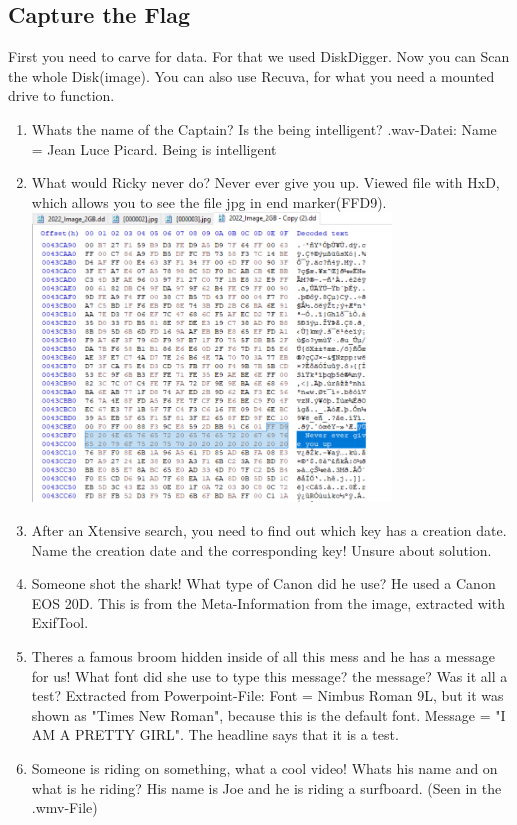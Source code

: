 \documentclass{scrreprt}
\begin{document}
\subsection{Capture the Flag}
First you need to carve for data. For that we used DiskDigger. Now you can Scan the whole Disk(image).
You can also use Recuva, for what you need a mounted drive to function.
\begin{enumerate}
\item Whats the name of the Captain? Is the being intelligent?
.wav-Datei: Name = Jean Luce Picard. Being is intelligent
\item What would Ricky never do?
Never ever give you up. Viewed file with HxD, which allows you to see the file jpg in end marker(FFD9).
\\\includegraphics[width=0.75\textwidth]{"graphics/hdx"}
\item After an Xtensive search, you need to find out which key has a creation date. Name the creation date and the corresponding key!
Unsure about solution.
\item Someone shot the shark! What type of Canon did he use?
He used a Canon EOS 20D. This is from the Meta-Information from the image, extracted with ExifTool.
\item Theres a famous broom hidden inside of all this mess and he has a message for us! What font did she use to type this message? the message? Was it all a test? Extracted from Powerpoint-File:
Font = Nimbus Roman 9L, but it was shown as "Times New Roman", because this is the default font. Message = "I AM A PRETTY GIRL". The headline says that it is a test.
\item Someone is riding on something, what a cool video! Whats his name and on what is he riding? His name is Joe and he is riding a surfboard. (Seen in the .wmv-File)

\end{enumerate}
\end{document}
